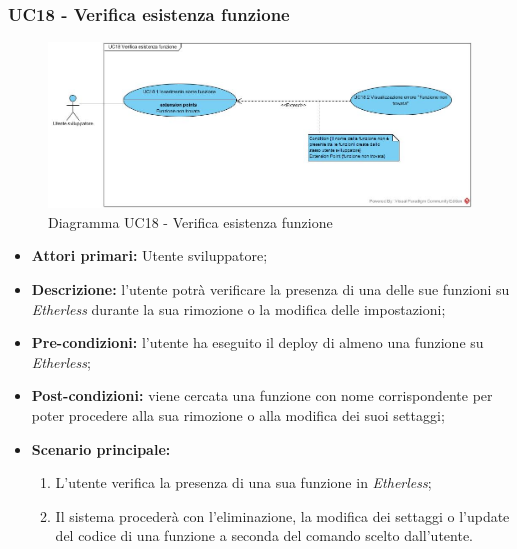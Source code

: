 \subsubsection{UC18 - Verifica esistenza funzione}
\begin{figure}[h]
	\centering
	\includegraphics[width=\linewidth]{res/img/UC18.jpg}
	\caption{Diagramma UC18 - Verifica esistenza funzione}
\end{figure}
\begin{itemize}
	\item \textbf{Attori primari:} Utente sviluppatore;
	\item \textbf{Descrizione:} l'utente potrà verificare la presenza di una delle sue funzioni su \textit{Etherless} durante la sua rimozione o la modifica delle impostazioni; 
	\item \textbf{Pre-condizioni:} l'utente ha eseguito il deploy di almeno una funzione su \textit{Etherless};
	\item \textbf{Post-condizioni:} viene cercata una funzione con nome corrispondente per poter procedere alla sua rimozione o alla modifica dei suoi settaggi;
	\item \textbf{Scenario principale:} 
	\begin{enumerate}
		\item L'utente verifica la presenza di una sua funzione in \textit{Etherless};
		\item Il sistema procederà con l'eliminazione, la modifica dei settaggi o l'update del codice di una funzione a seconda del comando scelto dall'utente.
	\end{enumerate}
\end{itemize}